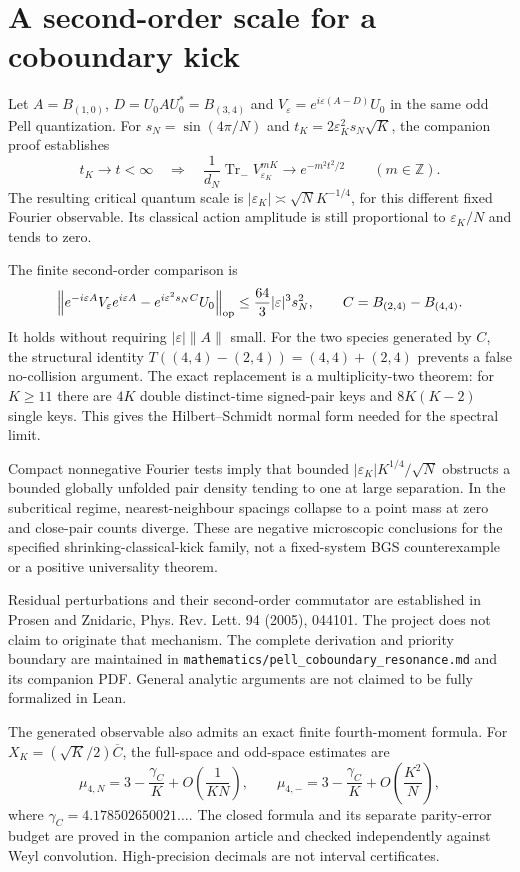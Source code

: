 \section{A second-order scale for a coboundary kick}
Let $A=B_{(1,0)}$, $D=U_0AU_0^*=B_{(3,4)}$ and
$V_\varepsilon=e^{i\varepsilon(A-D)}U_0$ in the same odd Pell quantization.
For $s_N=\sin(4\pi/N)$ and $t_K=2\varepsilon_K^2s_N\sqrt K$, the
companion proof establishes
\[
 t_K\longrightarrow t<\infty
 \quad\Longrightarrow\quad
 \frac{1}{d_N}\operatorname{Tr}_{-}V_{\varepsilon_K}^{mK}
       \longrightarrow e^{-m^2t^2/2}
 \qquad(m\in\mathbb Z).
\]
The resulting critical quantum scale is
$|\varepsilon_K|\asymp\sqrt N K^{-1/4}$, for this different fixed Fourier
observable. Its classical action amplitude is still proportional to
$\varepsilon_K/N$ and tends to zero.

The finite second-order comparison is
\[
 \left\|e^{-i\varepsilon A}V_\varepsilon e^{i\varepsilon A}
          -e^{i\varepsilon^2s_N C}U_0\right\|_{\rm op}
 \leq \frac{64}{3}|\varepsilon|^3s_N^2,
 \qquad C=B_{(2,4)}-B_{(4,4)}.
\]
It holds without requiring $|\varepsilon|\|A\|$ small. For the two
species generated by $C$, the structural identity
$T((4,4)-(2,4))=(4,4)+(2,4)$ prevents a false no-collision argument.
The exact replacement is a multiplicity-two theorem: for $K\geq11$ there
are $4K$ double distinct-time signed-pair keys and $8K(K-2)$ single keys.
This gives the Hilbert--Schmidt normal form needed for the spectral limit.

Compact nonnegative Fourier tests imply that bounded
$|\varepsilon_K|K^{1/4}/\sqrt N$ obstructs a bounded globally unfolded
pair density tending to one at large separation. In the subcritical regime,
nearest-neighbour spacings collapse to a point mass at zero and close-pair
counts diverge. These are negative microscopic conclusions for the specified
shrinking-classical-kick family, not a fixed-system BGS counterexample or a
positive universality theorem.

Residual perturbations and their second-order commutator are established in
Prosen and Znidaric, Phys. Rev. Lett. 94 (2005), 044101. The project does not
claim to originate that mechanism. The complete derivation and priority
boundary are maintained in
\texttt{mathematics/pell\_coboundary\_resonance.md} and its companion PDF.
General analytic arguments are not claimed to be fully formalized in Lean.

The generated observable also admits an exact finite fourth-moment formula.
For $X_K=(\sqrt K/2)\overline C$, the full-space and odd-space estimates are
\[
 \mu_{4,N}=3-\frac{\gamma_C}{K}+O\!\left(\frac1{KN}\right),
 \qquad
 \mu_{4,-}=3-\frac{\gamma_C}{K}+O\!\left(\frac{K^2}{N}\right),
\]
where $\gamma_C=4.178502650021\ldots$.
The closed formula and its separate parity-error budget are proved in the
companion article and checked independently against Weyl convolution.
High-precision decimals are not interval certificates.
